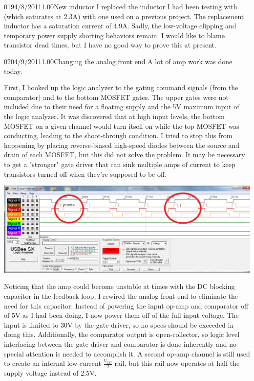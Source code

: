 \documentclass[12pt,letterpaper,onecolumn]{article}
\begin{document}
\begin{nbentry}{019}{4/8/2011}{1.00}{New inductor}
I replaced the inductor I had been testing with (which saturates at 2.3A) with one used on a previous project.  The replacement inductor has a saturation current of 4.9A.  Sadly, the low-voltage clipping and temporary power supply shorting behaviors remain.  I would like to blame transistor dead times, but I have no good way to prove this at present.
\end{nbentry}

\begin{nbentry}{020}{4/9/2011}{1.00}{Changing the analog front end}
A lot of amp work was done today.

First, I hooked up the logic analyzer to the gating command signals (from the comparator) and to the bottom MOSFET gates.  The upper gates were not included due to their need for a floating supply and the 5V maximum input of the logic analyzer.  It was discovered that at high input levels, the bottom MOSFET on a given channel would turn itself on while the top MOSFET was conducting, leading to the shoot-through condition.  I tried to stop this from happening by placing reverse-biased high-speed diodes between the source and drain of each MOSFET, but this did not solve the problem.  It may be necessary to get a "stronger" gate driver that can sink multiple amps of current to keep transistors turned off when they're supposed to be off.

\includegraphics[scale=0.33]{img/switch_glitch.png}

Noticing that the amp could become unstable at times with the DC blocking capacitor in the feedback loop, I rewired the analog front end to eliminate the need for this capacitor.  Instead of powering the input op-amp and comparator off of 5V as I had been doing, I now power them off of the full input voltage.  The input is limited to 30V by the gate driver, so no specs should be exceeded in doing this.  Additionally, the comparator output is open-collector, so logic level interfacing between the gate driver and comparator is done inherently and no special attention is needed to accomplish it.  A second op-amp channel is still used to create an internal low-current \(\frac{V_{CC}}{2}\) rail, but this rail now operates at half the supply voltage instead of 2.5V.


\end{nbentry}
\end{document}
